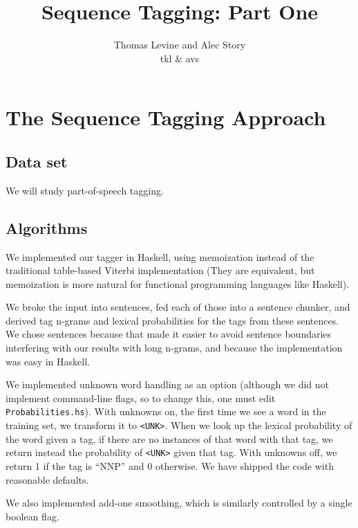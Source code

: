 \documentclass{article}
\title{Sequence Tagging: Part One}
\author{Thomas Levine and Alec Story\\\small{tkl\osn{22} \& avs\osn{38}}}
\begin{document}
\maketitle

\section{The Sequence Tagging Approach}

\subsection{Data set}
We will study part-of-speech tagging.
\subsection{Algorithms}

We implemented our tagger in Haskell, using memoization instead of the
traditional table-based Viterbi implementation (They are equivalent, but
memoization is more natural for functional programming languages like Haskell).

We broke the input into sentences, fed each of those into a sentence chunker,
and derived tag n-grams and lexical probabilities for the tags from these
sentences.  We chose sentences because that made it easier to avoid sentence
boundaries interfering with our results with long n-grams, and because the
implementation was easy in Haskell.

We implemented unknown word handling as an option (although we did not implement
command-line flags, so to change this, one must edit \verb+Probabilities.hs+).
With unknowns on, the first time we see a word in the training set, we transform
it to \verb+<UNK>+.  When we look up the lexical probability of the word given a
tag, if there are no instances of that word with that tag, we return instead the
probability of \verb+<UNK>+ given that tag.  With unknowns off, we return 1 if
the tag is ``NNP'' and 0 otherwise.  We have shipped the code with reasonable
defaults.

We also implemented add-one smoothing, which is similarly controlled by a single
boolean flag.
\end{document}
